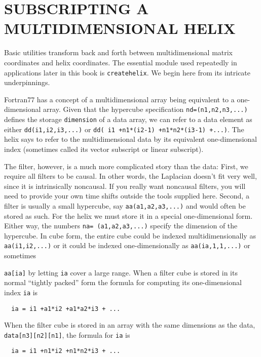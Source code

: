 \section{SUBSCRIPTING A MULTIDIMENSIONAL HELIX}
Basic utilities transform back and forth between
multidimensional matrix coordinates and helix coordinates.
The essential module used repeatedly in applications
later in this book is
\texttt{createhelix}.
We begin here from its intricate underpinnings.

\par
Fortran77 has a concept of a multidimensional array being equivalent
to a one-dimensional array.
Given that the hypercube specification
\texttt{nd=(n1,n2,n3,...)} defines the storage
\texttt{dimension} of a data array,
we can refer to a data element as either
\texttt{dd(i1,i2,i3,...)} or 
\texttt{dd( i1 +n1*(i2-1) +n1*n2*(i3-1) +...)}.
The helix says to refer to the multidimensional data
by its equivalent one-dimensional index
(sometimes called its vector subscript or linear subscript).

\par
The filter, however, is a much more complicated story than the data:
First, we require all filters to be causal.
In other words, the Laplacian doesn't fit very well,
since it is intrinsically noncausal.
If you really want noncausal filters,
you will need to provide your own time shifts outside the tools supplied here.
Second, a filter is usually a small hypercube, say
\texttt{aa(a1,a2,a3,...)}
and would often be stored as such.
For the helix we must store it in a special one-dimensional form.
Either way, the numbers
\texttt{na= (a1,a2,a3,...)}
specify the dimension of the hypercube.
In cube form, the entire cube could be indexed
multidimensionally as \texttt{aa(i1,i2,...)} or it could be indexed
one-dimensionally as \texttt{aa(ia,1,1,...)} or sometimes
\begin{comment}
\footnote{
        Some programming minutia:
        Fortran77 does not allow you to refer to an array
        by both its cartesian coordinates
        and by its linear subscript in the same subroutine.
        To access it both ways, you need a subroutine call,
        or you dimension it as 
        \texttt{data(n1,n2,...)}
        and then you refer to it as
        \texttt{data(id,1,1,...)}.
        Fortran90 follows the same rule outside modules.
        Where modules use other modules,
        the compiler does not allow you to refer
        to data both ways,
        unless the array is declared as
        \texttt{allocatable}.
        }
\end{comment}
\texttt{aa[ia]} by letting \texttt{ia} cover a large range.
When a filter cube is stored in its normal ``tightly packed'' form
the formula for computing
its one-dimensional index
\texttt{ia} is
\begin{verbatim}
  ia = i1 +a1*i2 +a1*a2*i3 + ...
\end{verbatim}
When the filter cube is stored in an array
with the same dimensions as the data,
\texttt{data[n3][n2][n1]},
the formula for \texttt{ia} is
\begin{verbatim}
  ia = i1 +n1*i2 +n1*n2*i3 + ...
\end{verbatim}

